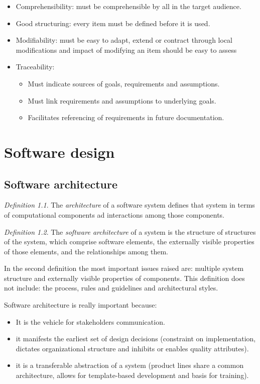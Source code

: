 \documentclass[12pt, a4paper]{report}
\theoremstyle{remark}
\newtheorem*{remark}{Definition}
\begin{document}
\begin{itemize}
        \item Comprehensibility: must be comprehensible by all in the target audience.
        \item Good structuring: every item must be defined before it is used.
        \item Modifiability: must be easy to adapt, extend or contract through local modifications and impact of modifying an item should be easy to assess
        \item Traceability: 
        \begin{itemize}
            \item Must indicate sources of goals, requirements and assumptions. 
            \item Must link requirements and assumptions to underlying goals.
            \item Facilitates referencing of requirements in future documentation.
        \end{itemize}
    \end{itemize}

\newpage

\chapter{Software design}
\section{Software architecture}
    \begin{remark}
        The \emph{architecture} of a software system defines that system in terms of computational components ad interactions among those components.
    \end{remark}
    \begin{remark}
        The \emph{software architecture} of a system is the structure of structures of the system, which comprise software elements, the externally visible properties of those elements, and the relationships among them.
    \end{remark}
    In the second definition the most important issues raised are: multiple system structure and externally visible properties of components. This definition does not include: the process, rules and guidelines and architectural styles.
    \par
    Software architecture is really important because: 
    \begin{itemize}
        \item It is the vehicle for stakeholders communication.
        \item it manifests the earliest set of design decisions (constraint on implementation, dictates organizational structure and inhibits or enables quality attributes).
        \item it is a transferable abstraction of a system (product lines share a common architecture, allows for template-based development and basis for training).
    \end{itemize}
\end{document}
